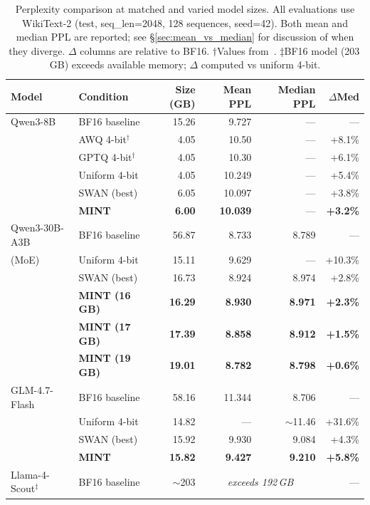 \documentclass{article}
\begin{document}
\begin{table}[h]
\centering
\caption{Perplexity comparison at matched and varied model sizes. All evaluations use WikiText-2 (test, seq\_len=2048, 128 sequences, seed=42). Both mean and median PPL are reported; see \S\ref{sec:mean_vs_median} for discussion of when they diverge. $\Delta$ columns are relative to BF16. $\dagger$Values from~\cite{xu2025qwen3quant}. $\ddagger$BF16 model (203\,GB) exceeds available memory; $\Delta$ computed vs uniform 4-bit.}
\label{tab:main_results}
\begin{tabular}{llrrrr}
\toprule
Model & Condition & Size (GB) & Mean PPL & Median PPL & $\Delta$Med \\
\midrule
Qwen3-8B & BF16 baseline & 15.26 & 9.727 & --- & --- \\
 & AWQ 4-bit$^\dagger$ & 4.05 & 10.50 & --- & +8.1\% \\
 & GPTQ 4-bit$^\dagger$ & 4.05 & 10.30 & --- & +6.1\% \\
 & Uniform 4-bit & 4.05 & 10.249 & --- & +5.4\% \\
 & SWAN (best) & 6.05 & 10.097 & --- & +3.8\% \\
 & \textbf{MINT} & \textbf{6.00} & \textbf{10.039} & --- & \textbf{+3.2\%} \\
\midrule
Qwen3-30B-A3B & BF16 baseline & 56.87 & 8.733 & 8.789 & --- \\
(MoE) & Uniform 4-bit & 15.11 & 9.629 & --- & +10.3\% \\
 & SWAN (best) & 16.73 & 8.924 & 8.974 & +2.8\% \\
 & \textbf{MINT (16\,GB)} & \textbf{16.29} & \textbf{8.930} & \textbf{8.971} & \textbf{+2.3\%} \\
 & \textbf{MINT (17\,GB)} & \textbf{17.39} & \textbf{8.858} & \textbf{8.912} & \textbf{+1.5\%} \\
 & \textbf{MINT (19\,GB)} & \textbf{19.01} & \textbf{8.782} & \textbf{8.798} & \textbf{+0.6\%} \\
\midrule
GLM-4.7-Flash & BF16 baseline & 58.16 & 11.344 & 8.706 & --- \\
 & Uniform 4-bit & 14.82 & --- & ${\sim}$11.46 & +31.6\% \\
 & SWAN (best) & 15.92 & 9.930 & 9.084 & +4.3\% \\
 & \textbf{MINT} & \textbf{15.82} & \textbf{9.427} & \textbf{9.210} & \textbf{+5.8\%} \\
\midrule
Llama-4-Scout$^\ddagger$ & BF16 baseline & ${\sim}$203 & \multicolumn{2}{c}{\emph{exceeds 192\,GB}} & --- \\

\end{tabular}
\end{table}
\end{document}
